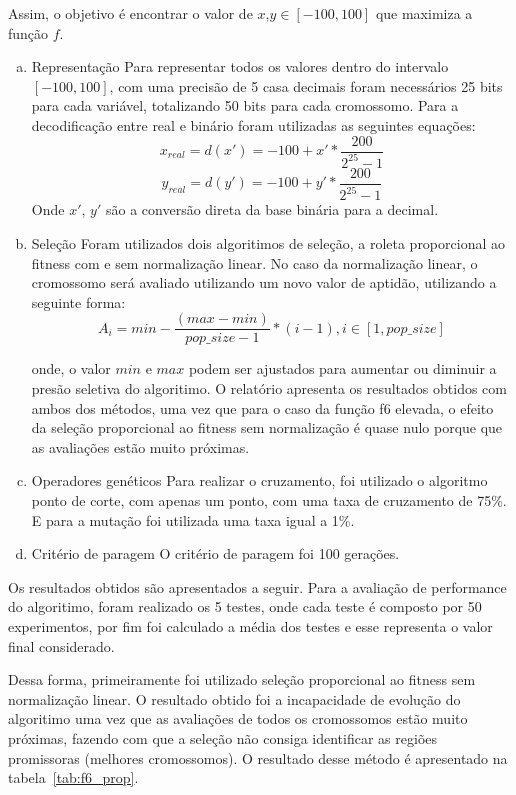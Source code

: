 \documentclass[12pt]{article}
\begin{document}

Assim, o objetivo é encontrar o valor de $x$,$y \in [-100,100]$ que maximiza a função $f$.

\begin{enumerate}[(a)]
	\item Representação
		\subitem Para representar todos os valores dentro do intervalo $[-100,100]$, com uma precisão
		de 5 casa decimais foram necessários 25 bits para cada variável, totalizando 50 bits para cada cromossomo.
		\subitem Para a decodificação entre real e binário foram utilizadas as seguintes equações:
		$$x_{real} = d(x') =  -100 + x' * \frac{200}{2^{25} - 1}$$
		$$y_{real} = d(y') =  -100 + y' * \frac{200}{2^{25} - 1}$$
		\subitem Onde $x'$, $y'$ são a conversão direta da base binária para a decimal.

	\item Seleção
		\subitem Foram utilizados dois algoritimos de seleção, a roleta proporcional ao fitness com e
		sem normalização linear. No caso da normalização linear, o cromossomo será avaliado utilizando
		um novo valor de aptidão, utilizando a seguinte forma:
		$$A_i = min - \frac{(max - min)}{pop\_size - 1}*(i - 1), i \in [1, pop\_size]$$

		onde, o valor $min$ e $max$ podem ser ajustados para aumentar ou diminuir a presão seletiva do algoritimo.
		O relatório apresenta os resultados obtidos com
		ambos dos métodos, uma vez que para o caso da função f6 elevada, o efeito da seleção
		proporcional ao fitness sem normalização é quase nulo porque que as avaliações estão muito próximas.

	\item Operadores genéticos
		\subitem Para realizar o cruzamento, foi utilizado o algoritmo ponto de corte, com apenas um ponto,
		com uma taxa de cruzamento de 75\%. E para a mutação foi utilizada uma taxa igual a 1\%.
	\item Critério de paragem
		\subitem O critério de paragem foi 100 gerações.
\end{enumerate}

Os resultados obtidos são apresentados a seguir. Para a avaliação de performance do algoritimo, foram
realizado os 5 testes, onde cada teste é composto por 50 experimentos, por fim foi calculado a média
dos testes e esse representa o valor final considerado.

Dessa forma, primeiramente foi utilizado seleção proporcional ao fitness sem normalização linear. O resultado obtido
foi a incapacidade de evolução do algoritimo uma vez que as avaliações de todos os cromossomos estão
muito próximas, fazendo com que a seleção não consiga identificar as regiões promissoras (melhores cromossomos). O
resultado desse método é apresentado na tabela~\ref{tab:f6_prop}.
\end{document}
